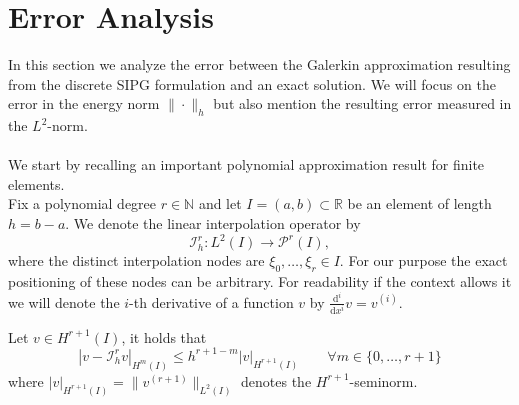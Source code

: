 \section{Error Analysis}
In this section we analyze the error between the Galerkin approximation resulting from the discrete SIPG formulation and an exact solution. 
We will focus on the error in the energy norm $\| \cdot \|_{h}$ but also mention the resulting error measured in the $L^2$-norm.
\\ \\
We start by recalling an important polynomial approximation result for finite elements. \\
Fix a polynomial degree $r \in \mathbb{N}$ and let $I = (a, b) \subset \mathbb{R}$ be an element of length $h = b-a$. We denote the linear interpolation operator by
\begin{equation}
	\mathcal{I}_h^r : L^2(I) \to \mathcal{P}^r(I),
\end{equation}
where the distinct interpolation nodes are $\xi_0,\ldots,\xi_r \in I$. For our purpose the exact positioning of these nodes can be arbitrary. 
For readability if the context allows it we will denote the $i$-th derivative of a function $v$ by $\frac{\text{d}^i}{\text{d} x^i} v = v^{(i)}$.
\begin{lemma}
	\label{lemma:interp_estimate}
	Let $v \in H^{r+1}(I)$, it holds that 
	\begin{equation*}
		| v - \mathcal{I}_h^r v |_{H^m(I)} \leq  h^{r+1-m} |v|_{H^{r+1}(I)} \qquad \forall m \in \{0,\ldots,r+1\}
	\end{equation*} 
	where $|v|_{H^{r+1}(I)} = \| v^{({r+1})} \|_{L^2(I)}$ denotes the $H^{r+1}$-seminorm. \\ 
\end{lemma}
